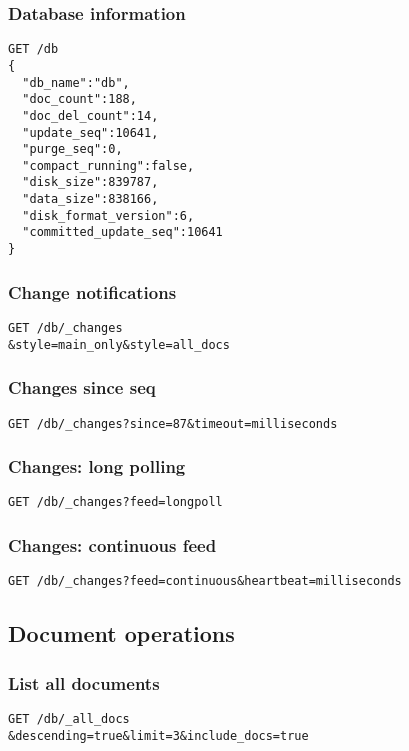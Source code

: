 \subsubsection{Database information}
\begin{lstlisting}
GET /db
{
  "db_name":"db",
  "doc_count":188,
  "doc_del_count":14,
  "update_seq":10641,
  "purge_seq":0,
  "compact_running":false,
  "disk_size":839787,
  "data_size":838166,
  "disk_format_version":6,
  "committed_update_seq":10641
}
\end{lstlisting}
  
\subsubsection{Change notifications}
\begin{lstlisting}
GET /db/_changes
&style=main_only&style=all_docs
\end{lstlisting}
  
\subsubsection{Changes since seq}
\begin{lstlisting}
GET /db/_changes?since=87&timeout=milliseconds
\end{lstlisting}
  
\subsubsection{Changes: long polling}
\begin{lstlisting}
GET /db/_changes?feed=longpoll
\end{lstlisting}

\subsubsection{Changes: continuous feed}
\begin{lstlisting}
GET /db/_changes?feed=continuous&heartbeat=milliseconds
\end{lstlisting}

\subsection{Document operations}
  
\subsubsection{List all documents}
\begin{lstlisting}
GET /db/_all_docs
&descending=true&limit=3&include_docs=true
\end{lstlisting}

